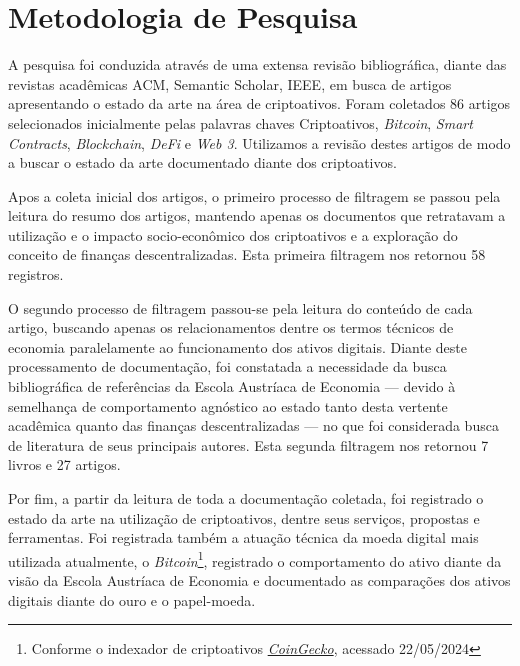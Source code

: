 \chapter{Metodologia de Pesquisa}
A pesquisa foi conduzida através de uma extensa revisão bibliográfica, diante das revistas acadêmicas ACM, Semantic Scholar, IEEE, em busca de artigos apresentando o estado da arte na área de criptoativos. Foram coletados 86 artigos selecionados inicialmente pelas palavras chaves Criptoativos, \textit{Bitcoin}, \textit{Smart Contracts}, \textit{Blockchain}, \textit{DeFi} e \textit{Web 3}. Utilizamos a revisão destes artigos de modo a buscar o estado da arte documentado diante dos criptoativos.

Apos a coleta inicial dos artigos, o primeiro processo de filtragem se passou pela leitura do resumo dos artigos, mantendo apenas os documentos que retratavam a utilização e o impacto socio-econômico dos criptoativos e a exploração do conceito de finanças descentralizadas. Esta primeira filtragem nos retornou 58 registros. 

O segundo processo de filtragem passou-se pela leitura do conteúdo de cada artigo, buscando apenas os relacionamentos dentre os termos técnicos de economia paralelamente ao funcionamento dos ativos digitais. Diante deste processamento de documentação, foi constatada a necessidade da busca bibliográfica de referências da Escola Austríaca de Economia — devido à semelhança de comportamento agnóstico ao estado tanto desta vertente acadêmica quanto das finanças descentralizadas — no que foi considerada busca de literatura de seus principais autores. Esta segunda filtragem nos retornou 7 livros e 27 artigos.

Por fim, a partir da leitura de toda a documentação coletada, foi registrado o estado da arte na utilização de criptoativos, dentre seus serviços, propostas e ferramentas. Foi registrada também a atuação técnica da moeda digital mais utilizada atualmente, o \textit{Bitcoin}\footnote{Conforme o indexador de criptoativos \href{https://www.coingecko.com/pt}{\textit{CoinGecko}}, acessado 22/05/2024}, registrado o comportamento do ativo diante da visão da Escola Austríaca de Economia e documentado as comparações dos ativos digitais diante do ouro e o papel-moeda.







